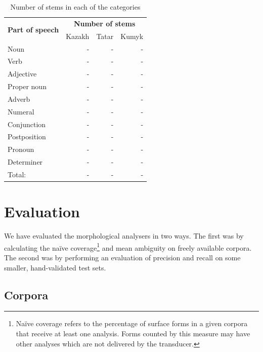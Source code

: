 \documentclass[a4paper,11pt,twocolumn]{article}
\begin{document}
\begin{table}
\begin{center}
\begin{tabular}{lrrr}
		\toprule
\multirow{2}{*}{\textbf{Part of speech}} & \multicolumn{3}{c}{\textbf{Number of stems}} \\ \cline{2-4}
                        & Kazakh & Tatar & Kumyk \\
		\midrule
		Noun & - & - & - \\
		Verb & - & - & - \\
		Adjective & - & - & - \\
		Proper noun & - & - & - \\
		Adverb & - & - & - \\
		Numeral & - & - & - \\
		Conjunction & - & - & - \\
		Postposition & - & - & - \\
		Pronoun & - & - & - \\
		Determiner & - & - & - \\
		\midrule
		Total: & - & - & - \\
		\bottomrule
\end{tabular}
 \caption{Number of stems in each of the categories}
 \label{table:coverage}
\end{center}

\end{table}

\section{Evaluation}

We have evaluated the morphological analysers in two ways. The first was by calculating the naïve coverage\footnote{Naïve coverage refers to the percentage of surface forms in a given corpora that receive at least one analysis.  Forms counted by this measure may have other analyses which are not delivered by the transducer.} and mean ambiguity 
on freely available corpora. The second was by performing an evaluation of precision and recall on some 
smaller, hand-validated test sets.

\subsection{Corpora}

\end{document}
